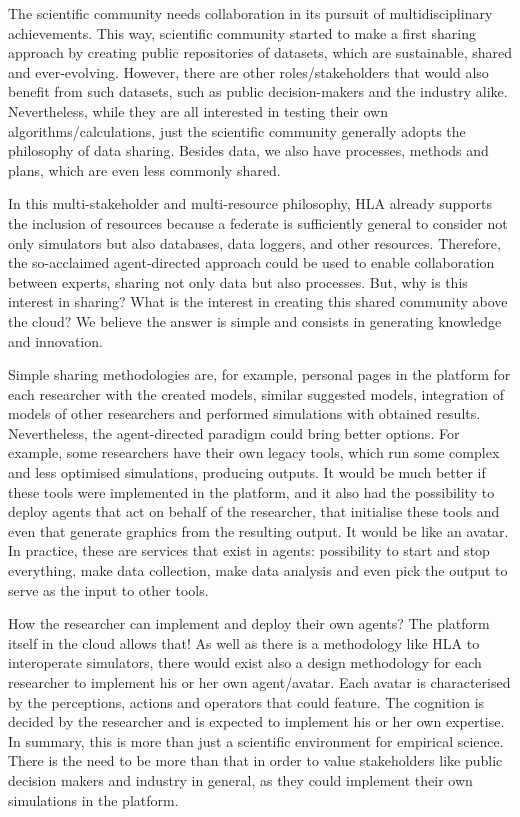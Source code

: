 \documentclass[conference]{IEEEtran}
\begin{document}

The scientific community needs collaboration in its pursuit of multidisciplinary achievements. This way, scientific community started to make a first sharing approach by creating public repositories of datasets, which are sustainable, shared and ever-evolving. However, there are other roles/stakeholders that would also benefit from such datasets, such as public decision-makers and the industry alike. Nevertheless, while they are all interested in testing their own algorithms/calculations, just the scientific community generally adopts the philosophy of data sharing. Besides data, we also have processes, methods and plans, which are even less commonly shared.

In this multi-stakeholder and multi-resource philosophy, HLA already supports the inclusion of resources because a federate is sufficiently general to consider not only simulators but also databases, data loggers, and other resources. Therefore, the so-acclaimed agent-directed approach could be used to enable collaboration between experts, sharing not only data but also processes. But, why is this interest in sharing? What is the interest in creating this shared community above the cloud? We believe the answer is simple and consists in generating knowledge and innovation.

Simple sharing methodologies are, for example, personal pages in the platform for each researcher with the created models, similar suggested models, integration of models of other researchers and performed simulations with obtained results. Nevertheless, the agent-directed paradigm could bring better options. For example, some researchers have their own legacy tools, which run some complex and less optimised simulations, producing outputs. It would be much better if these tools were implemented in the platform, and it also had the possibility to deploy agents that act on behalf of the researcher, that initialise these tools and even that generate graphics from the resulting output. It would be like an avatar. In practice, these are services that exist in agents: possibility to start and stop everything, make data collection, make data analysis and even pick the output to serve as the input to other tools.

How the researcher can implement and deploy their own agents? The platform itself in the cloud allows that! As well as there is a methodology like HLA to interoperate simulators, there would exist also a design methodology for each researcher to implement his or her own agent/avatar. Each avatar is characterised by the perceptions, actions and operators that could feature. The cognition is decided by the researcher and is expected to implement his or her own expertise. In summary, this is more than just a scientific environment for empirical science. There is the need to be more than that in order to value stakeholders like public decision makers and industry in general, as they could implement their own simulations in the platform.
\end{document}
